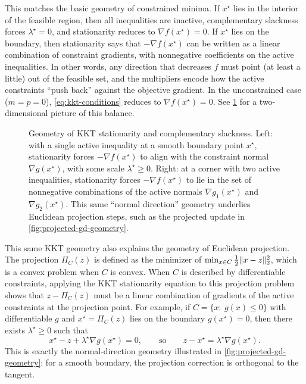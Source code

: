 This matches the basic geometry of constrained minima.
If $x^\star$ lies in the interior of the feasible region, then all inequalities are inactive, complementary slackness forces $\lambda^\star=0$, and stationarity reduces to $\nabla f(x^\star)=0$.
If $x^\star$ lies on the boundary, then stationarity says that $-\nabla f(x^\star)$ can be written as a linear combination of constraint gradients, with nonnegative coefficients on the active inequalities.
In other words, any direction that decreases $f$ must point (at least a little) out of the feasible set, and the multipliers encode how the active constraints ``push back'' against the objective gradient.
In the unconstrained case ($m=p=0$), \eqref{eq:kkt-conditions} reduces to $\nabla f(x^\star)=0$.
See \cref{fig:kkt-geometry} for a two-dimensional picture of this balance.

\begin{figure}[H]
  \centering
  
  \caption{Geometry of KKT stationarity and complementary slackness.
  Left: with a single active inequality at a smooth boundary point $x^\star$, stationarity forces $-\nabla f(x^\star)$ to align with the constraint normal $\nabla g(x^\star)$, with some scale $\lambda^\star\ge 0$.
  Right: at a corner with two active inequalities, stationarity forces $-\nabla f(x^\star)$ to lie in the set of nonnegative combinations of the active normals $\nabla g_1(x^\star)$ and $\nabla g_2(x^\star)$.
  This same ``normal direction'' geometry underlies Euclidean projection steps, such as the projected update in \cref{fig:projected-gd-geometry}.}
  \label{fig:kkt-geometry}
\end{figure}

This same KKT geometry also explains the geometry of Euclidean projection.
The projection $\Pi_C(z)$ is defined as the minimizer of $\min_{x\in C} \frac12\lVert x-z\rVert_2^2$, which is a convex problem when $C$ is convex.
When $C$ is described by differentiable constraints, applying the KKT stationarity equation to this projection problem shows that $z-\Pi_C(z)$ must be a linear combination of gradients of the active constraints at the projection point.
For example, if $C=\{x:\ g(x)\le 0\}$ with differentiable $g$ and $x^\star=\Pi_C(z)$ lies on the boundary $g(x^\star)=0$, then there exists $\lambda^\star\ge 0$ such that
\[
  x^\star - z + \lambda^\star \nabla g(x^\star)=0,
  \qquad\text{so}\qquad
  z-x^\star = \lambda^\star \nabla g(x^\star).
\]
This is exactly the normal-direction geometry illustrated in \cref{fig:projected-gd-geometry}: for a smooth boundary, the projection correction is orthogonal to the tangent.

